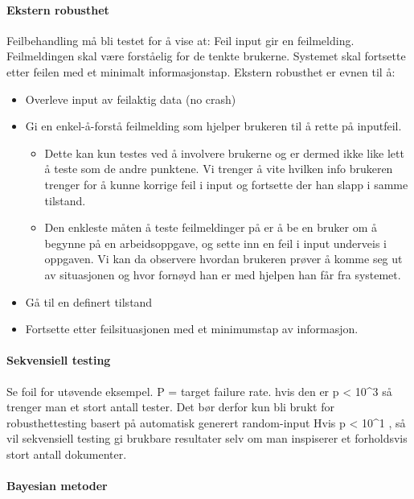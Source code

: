 \paragraph{Ekstern robusthet}

Feilbehandling må bli testet for å vise at: Feil input gir en
feilmelding. Feilmeldingen skal være forståelig for de tenkte brukerne.
Systemet skal fortsette etter feilen med et minimalt informasjonstap.
Ekstern robusthet er evnen til å:

\begin{itemize}
\item
  Overleve input av feilaktig data (no crash)
\item
  Gi en enkel-å-forstå feilmelding som hjelper brukeren til å rette på
  inputfeil.
  \begin{itemize}
  \item
    Dette kan kun testes ved å involvere brukerne og er dermed ikke like
    lett å teste som de andre punktene. Vi trenger å vite hvilken info
    brukeren trenger for å kunne korrige feil i input og fortsette der
    han slapp i samme tilstand.
  \item
    Den enkleste måten å teste feilmeldinger på er å be en bruker om å
    begynne på en arbeidsoppgave, og sette inn en feil i input underveis
    i oppgaven. Vi kan da observere hvordan brukeren prøver å komme seg
    ut av situasjonen og hvor fornøyd han er med hjelpen han får fra
    systemet.
  \end{itemize}
\item
  Gå til en definert tilstand
\item
  Fortsette etter feilsituasjonen med et minimumstap av informasjon.
\end{itemize}
\paragraph{Sekvensiell testing}

Se foil for utøvende eksempel. P = target failure rate. hvis den er p
\textless{} 10\^{}3 så trenger man et stort antall tester. Det bør
derfor kun bli brukt for robusthettesting basert på automatisk generert
random-input Hvis p \textless{} 10\^{}1 , så vil sekvensiell testing gi
brukbare resultater selv om man inspiserer et forholdsvis stort antall
dokumenter.

\paragraph{Bayesian metoder}

